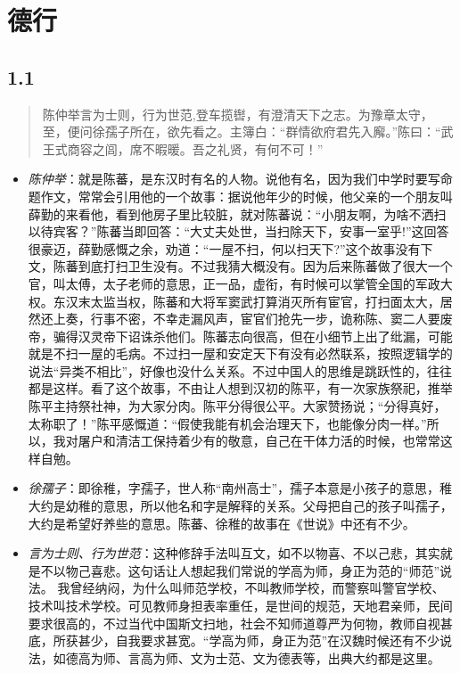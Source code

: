 \documentclass[]{book}
\providecommand{\tightlist}{%
  \setlength{\itemsep}{0pt}\setlength{\parskip}{0pt}}
\begin{document}
\chapter{德行}

\section{1.1}\label{section}

\begin{quote}
陈仲举言为士则，行为世范,登车揽辔，有澄清天下之志。为豫章太守，至，便问徐孺子所在，欲先看之。主簿白：``群情欲府君先入廨。''陈曰：``武王式商容之闾，席不暇暖。吾之礼贤，有何不可！''
\end{quote}

\begin{itemize}
\tightlist
\item
  \emph{陈仲举}：就是陈蕃，是东汉时有名的人物。说他有名，因为我们中学时要写命题作文，常常会引用他的一个故事：据说他年少的时候，他父亲的一个朋友叫薛勤的来看他，看到他房子里比较脏，就对陈蕃说：``小朋友啊，为啥不洒扫以待宾客？''陈蕃当即回答：``大丈夫处世，当扫除天下，安事一室乎!''这回答很豪迈，薛勤感慨之余，劝道：``一屋不扫，何以扫天下?''这个故事没有下文，陈蕃到底打扫卫生没有。不过我猜大概没有。因为后来陈蕃做了很大一个官，叫太傅，太子老师的意思，正一品，虚衔，有时候可以掌管全国的军政大权。东汉末太监当权，陈蕃和大将军窦武打算消灭所有宦官，打扫面太大，居然还上奏，行事不密，不幸走漏风声，宦官们抢先一步，诡称陈、窦二人要废帝，骗得汉灵帝下诏诛杀他们。陈蕃志向很高，但在小细节上出了纰漏，可能就是不扫一屋的毛病。不过扫一屋和安定天下有没有必然联系，按照逻辑学的说法``异类不相比''，好像也没什么关系。不过中国人的思维是跳跃性的，往往都是这样。看了这个故事，不由让人想到汉初的陈平，有一次家族祭祀，推举陈平主持祭社神，为大家分肉。陈平分得很公平。大家赞扬说；``分得真好，太称职了！''陈平感慨道：``假使我能有机会治理天下，也能像分肉一样。''所以，我对屠户和清洁工保持着少有的敬意，自己在干体力活的时候，也常常这样自勉。
\item
  \emph{徐孺子}：即徐稚，字孺子，世人称``南州高士''，孺子本意是小孩子的意思，稚大约是幼稚的意思，所以他名和字是解释的关系。父母把自己的孩子叫孺子，大约是希望好养些的意思。陈蕃、徐稚的故事在《世说》中还有不少。
\item
  \emph{言为士则、行为世范}：这种修辞手法叫互文，如不以物喜、不以己悲，其实就是不以物己喜悲。这句话让人想起我们常说的学高为师，身正为范的``师范''说法。
  我曾经纳闷，为什么叫师范学校，不叫教师学校，而警察叫警官学校、技术叫技术学校。可见教师身担表率重任，是世间的规范，天地君亲师，民间要求很高的，不过当代中国斯文扫地，社会不知师道尊严为何物，教师自视甚底，所获甚少，自我要求甚宽。``学高为师，身正为范''在汉魏时候还有不少说法，如德高为师、言高为师、文为士范、文为德表等，出典大约都是这里。

\end{itemize}
\end{document}
